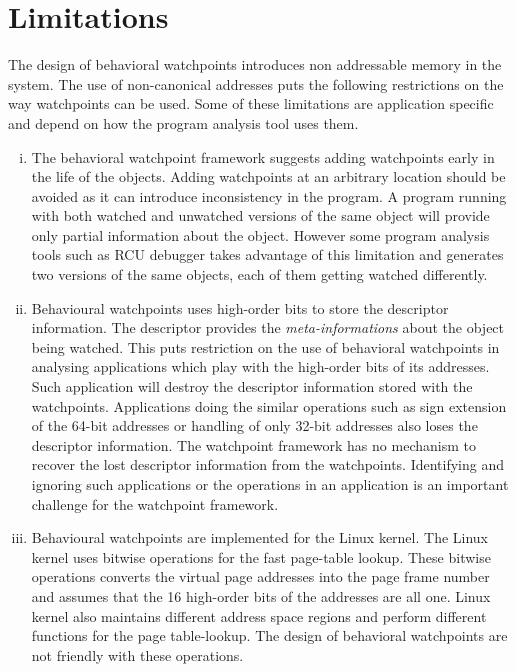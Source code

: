 \section{Limitations}
The design of behavioral watchpoints introduces non addressable memory in the system. The use of non-canonical addresses puts the following restrictions on the way watchpoints can be used. Some of these limitations are application specific and depend on how the program analysis tool uses them.
\begin{enumerate}[i)]
	\item The behavioral watchpoint framework suggests adding watchpoints early in the life of the objects. Adding watchpoints at an arbitrary location should be avoided as it can introduce inconsistency in the program. A program running with both watched and unwatched versions of the same object will provide only partial information about the object. However some program analysis tools such as RCU debugger takes advantage of this limitation and generates two versions of the same objects, each of them getting watched differently.
	\item Behavioural watchpoints uses high-order bits to store the descriptor information. The descriptor provides the \emph{meta-informations} about the object being watched. This puts restriction on the use of behavioral watchpoints in analysing applications which play with the high-order bits of its addresses. Such application will destroy the descriptor information stored with the watchpoints. Applications doing the similar operations such as sign extension of the 64-bit addresses or handling of only 32-bit addresses also loses the descriptor information. The watchpoint framework has no mechanism to recover the lost descriptor information from the watchpoints. Identifying and ignoring such applications or the operations in an application is an important challenge for the watchpoint framework.  

	\item Behavioural watchpoints are implemented for the Linux kernel. The Linux kernel uses bitwise operations for the fast page-table lookup. These bitwise operations converts the virtual page addresses into the page frame number and assumes that the 16 high-order bits of the addresses are all one. Linux kernel also maintains different address space regions and perform different functions for the page table-lookup. The design of behavioral watchpoints are not friendly with these operations.

\end{enumerate}


